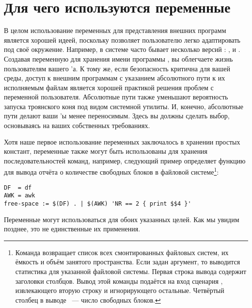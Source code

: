 \section{Для чего используются переменные}

В целом использование переменных для представления внешних программ
является хорошей идеей, поскольку позволяет пользователю легко
адаптировать \Makefile{} под своё окружение. Например, в системе
часто бывает несколько версий : ,
 и . Создавая переменную  для
хранения имени программы , вы облегчаете жизнь
пользователям вашего \Makefile{}'а. К тому же, если безопасность
критична для вашей среды, доступ к внешним программам с указанием
абсолютного пути к их исполняемым файлам является хорошей практикой
решения проблем с переменной  пользователя. Абсолютные
пути также уменьшают вероятность запуска троянского коня под видом
системной утилиты. И, конечно, абсолютные пути делают ваши
\Makefile{}'ы менее переносимым. Здесь вы должны сделать выбор,
основываясь на ваших собственных требованиях.

Хотя наше первое использование переменных заключалось в хранении
простых констант, переменные также могут быть использованы для
хранения последовательностей команд, например, следующий пример
определяет функцию для вывода отчёта о количестве свободных блоков в
файловой системе\footnote{Команда  возвращает список всех
смонтированных файловых систем, их ёмкость и объём занятого
пространства. Если задан аргумент, то выводится статистика для
указанной файловой системы. Первая строка вывода содержит заголовки
столбцов. Вывод этой команды подаётся на вход сценария ,
извлекающего вторую строку и игнорирующего остальные. Четвёртый
столбец в выводе ~--- число свободных блоков.}:

{\footnotesize
\begin{verbatim}
DF  = df
AWK = awk
free-space := $(DF) . | $(AWK) 'NR == 2 { print $$4 }'
\end{verbatim}
}

Переменные могут использоваться для обоих указанных целей. Как мы
увидим позднее, это не единственные их применения. 
